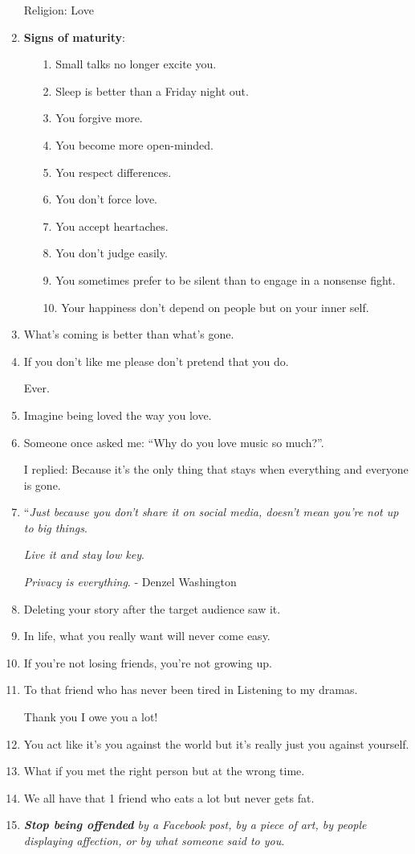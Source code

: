 \documentclass{article}
\begin{document}
\begin{enumerate}
	Religion: Love
	\item \textbf{Signs of maturity}:
	\begin{itemize}
		\item[1.] Small talks no longer excite you.
		\item[2.] Sleep is better than a Friday night out.
		\item[3.] You forgive more.
		\item[4.] You become more open-minded.
		\item[5.] You respect differences.
		\item[6.] You don't force love.
		\item[7.] You accept heartaches.
		\item[8.] You don't judge easily.
		\item[9.] You sometimes prefer to be silent than to engage in a nonsense fight.
		\item[10.] Your happiness don't depend on people but on your inner self.
	\end{itemize}
	\item What's coming is better than what's gone.
	\item If you don't like me please don't pretend that you do.
	
	Ever.
	\item Imagine being loved the way you love.
	\item Someone once asked me: ``Why do you love music so much?''.
	
	I replied: Because it's the only thing that stays when everything and everyone is gone.
	\item ``\textit{Just because you don't share it on social media, doesn't mean you're not up to big things}.
	
	\textit{Live it and stay low key}.
	
	\textit{Privacy is everything}. - Denzel Washington
	\item Deleting your story after the target audience saw it.
	\item In life, what you really want will never come easy.
	\item If you're not losing friends, you're not growing up.
	\item To that friend who has never been tired in Listening to my dramas.
	
	Thank you I owe you a lot!
	\item You act like it's you against the world but it's really just you against yourself.
	\item What if you met the right person but at the wrong time.
	\item We all have that 1 friend who eats a lot but never gets fat.
	\item \textit{\textbf{Stop being offended} by a Facebook post, by a piece of art, by people displaying affection, or by what someone said to you}.
	

\end{enumerate}
\end{document}

